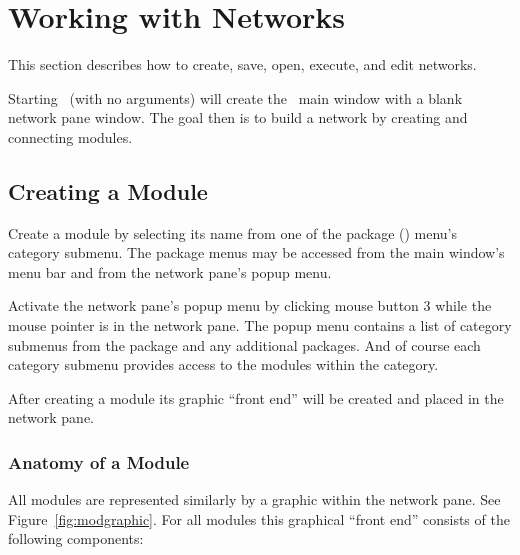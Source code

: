 %

  \newcommand{\modgraphic}%
  {\centerline{\epsfig{file=figures/modgraphic.eps,width=\columnwidth}}}
\begin{htmlonly}
  \newcommand{\srwindow}{%
  \htmladdimg[align=top,width=6,alt="SCIRun Window"]
  {../figures/modgraphic.gif}}
\end{htmlonly}

\section{Working with Networks}
\label{sec:workwithnets}

This section describes how to create, save, open, execute, and edit
networks.

Starting \sr\ (with no arguments) will create the \sr\ main window with a
blank network pane window.  The goal then is to build a network by
creating and connecting modules.


\subsection{Creating a Module}
\label{sec:creatingmodules}

Create a module by selecting its name from one of the package (\eg \sr)
menu's category submenu.  The package menus may be accessed from the main
window's menu bar and from the network pane's popup menu.

Activate the network pane's popup menu by clicking  mouse
button 3 while the mouse pointer is in the network pane.  The popup menu
contains a list of category submenus from the \sr package and any
additional packages.  And of course each category submenu provides access
to the modules within the category.

After creating a module its graphic ``front end'' will be created and
placed in the network pane.

\subsubsection{Anatomy of a Module}
\label{sec:modanatomy}

All modules are represented similarly by a graphic within the network pane.
See Figure~\ref{fig:modgraphic}. For all modules this graphical ``front
end'' consists of the following components:

